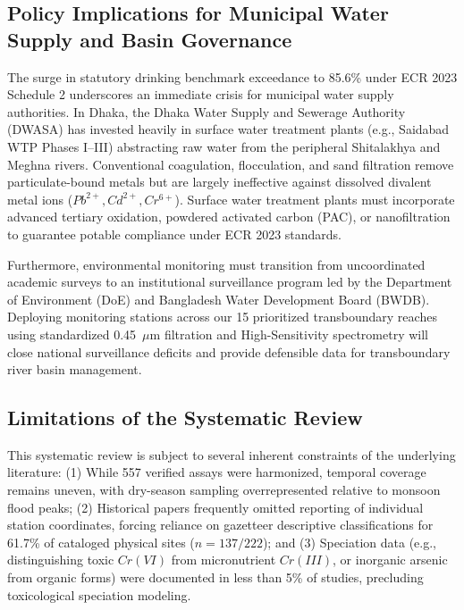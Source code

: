 \documentclass[authoryear,preprint,12pt]{elsarticle}
\begin{document}
\subsection{Policy Implications for Municipal Water Supply and Basin Governance}
The surge in statutory drinking benchmark exceedance to 85.6\% under ECR 2023 Schedule 2 underscores an immediate crisis for municipal water supply authorities. In Dhaka, the Dhaka Water Supply and Sewerage Authority (DWASA) has invested heavily in surface water treatment plants (e.g., Saidabad WTP Phases I--III) abstracting raw water from the peripheral Shitalakhya and Meghna rivers. Conventional coagulation, flocculation, and sand filtration remove particulate-bound metals but are largely ineffective against dissolved divalent metal ions ($Pb^{2+}, Cd^{2+}, Cr^{6+}$). Surface water treatment plants must incorporate advanced tertiary oxidation, powdered activated carbon (PAC), or nanofiltration to guarantee potable compliance under ECR 2023 standards.

Furthermore, environmental monitoring must transition from uncoordinated academic surveys to an institutional surveillance program led by the Department of Environment (DoE) and Bangladesh Water Development Board (BWDB). Deploying monitoring stations across our 15 prioritized transboundary reaches using standardized 0.45~$\mu\text{m}$ filtration and High-Sensitivity spectrometry will close national surveillance deficits and provide defensible data for transboundary river basin management.

\subsection{Limitations of the Systematic Review}
This systematic review is subject to several inherent constraints of the underlying literature:
(1) While 557 verified assays were harmonized, temporal coverage remains uneven, with dry-season sampling overrepresented relative to monsoon flood peaks;
(2) Historical papers frequently omitted reporting of individual station coordinates, forcing reliance on gazetteer descriptive classifications for 61.7\% of cataloged physical sites ($n=137/222$); and
(3) Speciation data (e.g., distinguishing toxic $Cr(VI)$ from micronutrient $Cr(III)$, or inorganic arsenic from organic forms) were documented in less than 5\% of studies, precluding toxicological speciation modeling.
\end{document}
